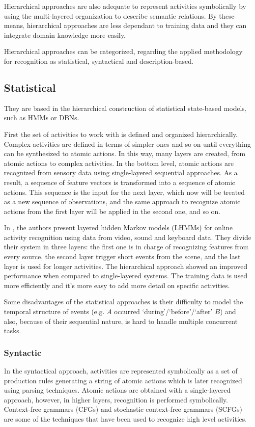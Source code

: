 \documentclass[a4paper, 12pt, openany, oneside]{book}
\begin{document}
Hierarchical approaches are also adequate to represent activities symbolically by using the multi-layered organization to describe semantic relations.
By these means, hierarchical approaches are less dependant to training data and they can integrate domain knowledge more easily.

Hierarchical approaches can be categorized, regarding the applied methodology for recognition as statistical, syntactical and description-based. %


\subsection{Statistical}
They are based in the hierarchical construction of statistical state-based models, such as HMMs or DBNs.

First the set of activities to work with is defined and organized hierarchically.
Complex activities are defined in terms of simpler ones and so on until everything can be synthesized to atomic actions.
In this way, many layers are created, from atomic actions to complex activities.
In the bottom level, atomic actions are recognized from sensory data using single-layered sequential approaches. 
As a result, a sequence of feature vectors is transformed into a sequence of atomic actions.
This sequence is the input for the next layer, which now will be treated as a new sequence of observations, and the same approach to recognize atomic actions from the first layer will be applied in the second one, and so on.

In \citep{Oliver2002_LayRepHumActRec}, the authors present layered hidden Markov models (LHMMs) for online activity recognition using data from video, sound and keyboard data. 
They divide their system in three layers: the first one is in charge of recognizing features from every source, the second layer trigger short events from the scene, and the last layer is used for longer activities. 
The hierarchical approach showed an improved performance when compared to single-layered systems.
The training data is used more efficiently and it's more easy to add more detail on specific activities.

Some disadvantages of the statistical approaches is their difficulty to model the temporal structure of events (e.g. $A$ occurred `during'/`before'/`after' $B$) and also, because of their sequential nature, is hard to handle multiple concurrent tasks.

\subsubsection{Syntactic}
In the syntactical approach, activities are represented symbolically as a set of production rules generating a string of atomic actions which is later recognized using parsing techniques.
Atomic actions are obtained with a single-layered approach, however, in higher layers, recognition is performed symbolically.
Context-free grammars (CFGs) and stochastic context-free grammars (SCFGs) are some of the techniques that have been used to recognize high level activities.
\end{document}
